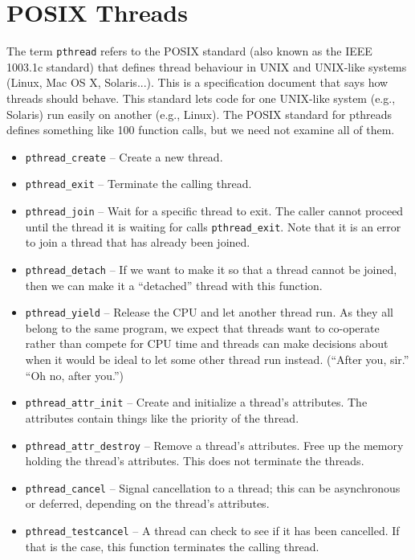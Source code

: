 




\section*{POSIX Threads}

The term \texttt{pthread} refers to the POSIX standard (also known as the IEEE 1003.1c standard) that defines thread behaviour in UNIX and UNIX-like systems (Linux, Mac OS X, Solaris...). This is a specification document that says how threads should behave. This standard lets code for one UNIX-like system (e.g., Solaris) run easily on another (e.g., Linux). The POSIX standard for pthreads defines something like 100 function calls, but we need not examine all of them. 

\begin{itemize}
	\item \texttt{pthread\_create} -- Create a new thread. 
	\item \texttt{pthread\_exit} -- Terminate the calling thread.
	\item \texttt{pthread\_join} -- Wait for a specific thread to exit. The caller cannot proceed until the thread it is waiting for calls \texttt{pthread\_exit}. Note that it is an error to join a thread that has already been joined.
	\item \texttt{pthread\_detach} -- If we want to make it so that a thread cannot be joined, then we can make it a ``detached'' thread with this function.
	\item \texttt{pthread\_yield} -- Release the CPU and let another thread run. As they all belong to the same program, we expect that threads want to co-operate rather than compete for CPU time and threads can make decisions about when it would be ideal to let some other thread run instead. (``After you, sir.'' ``Oh no, after you.'')
	\item \texttt{pthread\_attr\_init} -- Create and initialize a thread's attributes. The attributes contain things like the priority of the thread.
	\item \texttt{pthread\_attr\_destroy} -- Remove a thread's attributes. Free up the memory holding the thread's attributes. This does not terminate the threads.
	\item \texttt{pthread\_cancel} -- Signal cancellation to a thread; this can be asynchronous or deferred, depending on the thread's attributes.
	\item \texttt{pthread\_testcancel} -- A thread can check to see if it has been cancelled. If that is the case, this function terminates the calling thread.
\end{itemize}

